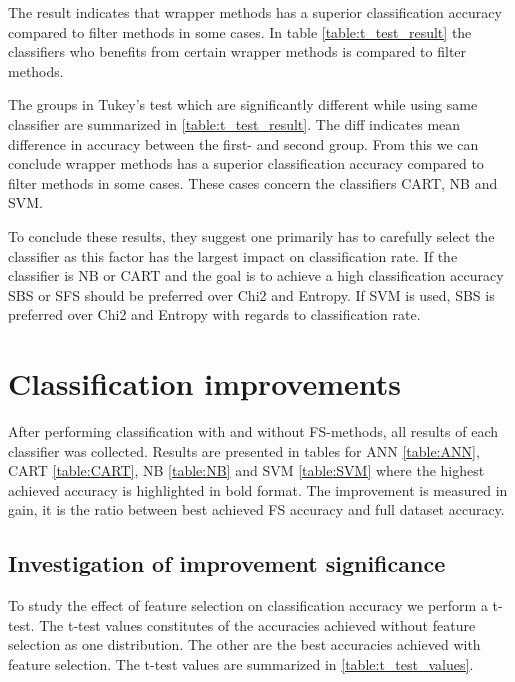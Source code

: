 The result indicates that wrapper methods has a superior classification accuracy compared to filter methods in some cases. In table \ref{table:t_test_result} the classifiers who benefits from certain wrapper methods is compared to filter methods.

The groups in Tukey's test which are significantly different while using same classifier are summarized in \ref{table:t_test_result}. The diff indicates mean difference in accuracy between the first- and second group. From this we can conclude wrapper methods has a superior classification accuracy compared to filter methods in some cases. These cases concern the classifiers CART, NB and SVM.



To conclude these results, they suggest one primarily has to carefully select the classifier as this factor has the largest impact on classification rate. If the classifier is NB or CART and the goal is to achieve a high classification accuracy SBS or SFS should be preferred over Chi2 and Entropy. If SVM is used, SBS is preferred over Chi2 and Entropy with regards to classification rate.


\section{Classification improvements}

After performing classification with and without FS-methods, all results of each classifier was collected. Results are presented in tables for ANN \ref{table:ANN}, CART \ref{table:CART}, NB \ref{table:NB} and SVM \ref{table:SVM} where the highest achieved accuracy is highlighted in bold format. The improvement is measured in gain, it is the ratio between best achieved FS accuracy and full dataset accuracy.



\subsection{Investigation of improvement significance}
\label{sec:Investigation_improvement}

To study the effect of feature selection on classification accuracy we perform a t-test. The t-test values constitutes of the accuracies achieved without feature selection as one distribution. The other are the best accuracies achieved with feature selection. The t-test values are summarized in \ref{table:t_test_values}.

